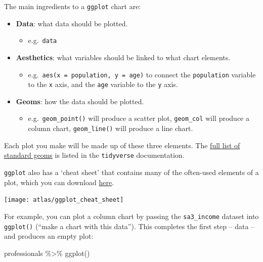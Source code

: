 \documentclass[
]{book}
\newenvironment{Shaded}{\begin{snugshade}}{\end{snugshade}}
\newcommand{\FunctionTok}[1]{\textcolor[rgb]{0.00,0.00,0.00}{#1}}
\newcommand{\NormalTok}[1]{#1}
\newcommand{\SpecialCharTok}[1]{\textcolor[rgb]{0.00,0.00,0.00}{#1}}
\providecommand{\tightlist}{%
  \setlength{\itemsep}{0pt}\setlength{\parskip}{0pt}}
\begin{document}
The main ingredients to a \texttt{ggplot} chart are:

\begin{itemize}
\tightlist
\item
  \textbf{Data}: what data should be plotted.

  \begin{itemize}
  \tightlist
  \item
    e.g.~\texttt{data}
  \end{itemize}
\item
  \textbf{Aesthetics}: what variables should be linked to what chart elements.

  \begin{itemize}
  \tightlist
  \item
    e.g.~\texttt{aes(x\ =\ population,\ y\ =\ age)} to connect the \texttt{population} variable to the \texttt{x} axis, and the \texttt{age} variable to the \texttt{y} axis.
  \end{itemize}
\item
  \textbf{Geoms}: how the data should be plotted.

  \begin{itemize}
  \tightlist
  \item
    e.g.~\texttt{geom\_point()} will produce a scatter plot, \texttt{geom\_col} will produce a column chart, \texttt{geom\_line()} will produce a line chart.
  \end{itemize}
\end{itemize}

Each plot you make will be made up of these three elements. The \href{https://ggplot2.tidyverse.org/reference/}{full list of standard geoms} is listed in the \texttt{tidyverse} documentation.

\texttt{ggplot} also has a `cheat sheet' that contains many of the often-used elements of a plot, which you can download \href{https://github.com/rstudio/cheatsheets/raw/master/data-visualization-2.1.pdf}{here}.

\begin{center}\texttt{[image: atlas/ggplot\_cheat\_sheet]} \end{center}

For example, you can plot a column chart by passing the \texttt{sa3\_income} dataset into \texttt{ggplot()} (``make a chart with this data''). This completes the first step -- data -- and produces an empty plot:

\begin{Shaded}
\begin{Highlighting}[]
\NormalTok{professionals }\SpecialCharTok{\%\textgreater{}\%} 
        \FunctionTok{ggplot}\NormalTok{()}
\end{Highlighting}
\end{Shaded}
\end{document}
